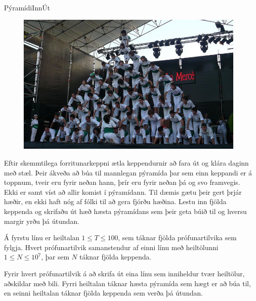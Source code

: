\begin{problem}{Pýramídi}{Inn}{Út}{~}{~}

	\begin{figure}
		\vspace{-25pt}
		\begin{center}
			\includegraphics[scale=0.2]{../Pyramidi/pyramid.jpg}
		\end{center}
		\vspace{-30pt}
	\end{figure}

	Eftir skemmtilega forritunarkeppni ætla keppendurnir að fara út og klára daginn með stæl.
	Þeir ákveða að búa til mannlegan pýramída þar sem einn keppandi er á toppnum, tveir eru fyrir neðan hann, þrír eru fyrir neðan þá og svo framvegis.
	Ekki er samt víst að allir komist í pýramídann. Til dæmis gætu þeir gert þrjár hæðir, en ekki haft nóg af fólki til að gera fjórðu hæðina.
	Lestu inn fjölda keppenda og skrifaðu út hæð hæsta pýramídans sem þeir geta búið til og hversu margir yrðu þá útundan.

	\Input

		Á fyrstu línu er heiltalan $1 \leq T \leq 100$, sem táknar fjölda prófunartilvika sem fylgja. Hvert prófunartilvik samanstendur af einni línu með heiltölunni $1 \leq N \leq 10^7$, þar sem $N$ táknar fjölda keppenda.

	\Output

		Fyrir hvert prófunartilvik á að skrifa út eina línu sem inniheldur tvær heiltölur, aðskildar með bili. Fyrri heiltalan táknar hæsta pýramída sem hægt er að búa til, en seinni heiltalan táknar fjölda keppenda sem verða þá útundan.

	\Examples


\begin{example}
%
\end{example}
\end{problem}